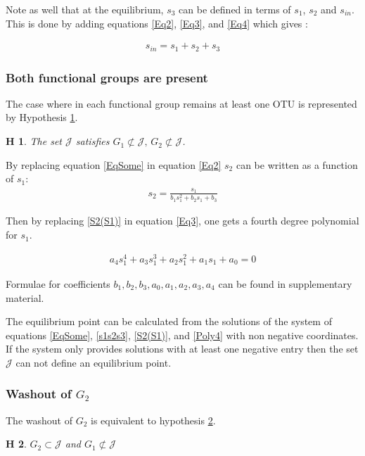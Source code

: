 \documentclass[3p,times]{article}
\newtheorem{hypo}{H}
\begin{document}
Note as well that at the equilibrium, $s_3$ can be defined in terms of $s_1$, $s_2$ and $s_{in}$. This is done by adding equations \eqref{Eq2}, \eqref{Eq3},  and \eqref{Eq4} which gives :

\begin{align}
s_{in} = s_1+s_2+s_3 \label{s1s2s3}
\end{align}

\subsubsection{Both functional groups are present}

The case where in each functional group remains at least one OTU is represented by Hypothesis \ref{hypothesis CN}.
\begin{hypo}The set $\mathcal{J}$ satisfies $ G_1 \not \subset \mathcal{J} , \, G_2 \not \subset \mathcal{J} $.
	\label{hypothesis CN}
\end{hypo} 


By replacing equation \eqref{EqSome} in equation \eqref{Eq2} $s_2$ can be written as a function of $s_1$:
\begin{align}
s_2 = \frac{s_1}{b_1s_1^2+b_2s_1+b_3} \label{S2(S1)}
\end{align}


Then by replacing  \eqref{S2(S1)} in equation \eqref{Eq3}, one gets a fourth degree polynomial for $s_1$. 

\begin{align}
\label{Poly4} a_4s_1^4+a_3s_1^3+a_2s_1^2+a_1s_1+a_0 = 0
\end{align}


Formulae for coefficients $b_1, b_2, b_3, a_0, a_1, a_2, a_3, a_4$ can be found in supplementary material. 

The equilibrium point can be calculated from the solutions of the system of equations \eqref{EqSome}, \eqref{s1s2s3}, \eqref{S2(S1)}, and \eqref{Poly4} with non negative coordinates. If the system only provides solutions with at least one negative entry then the set $\mathcal{J}$ can not define an equilibrium point.


\subsubsection{Washout of $G_2$}

The washout of $G_2$ is equivalent to  hypothesis \ref{hypothesis washout G2}.

\begin{hypo}
	$G_2 \subset \mathcal{J}$ and $G_1 \not \subset \mathcal{J}$
	\label{hypothesis washout G2}
\end{hypo} 
\end{document}
